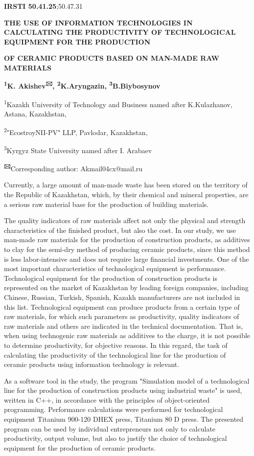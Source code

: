 \newpage
{\bfseries IRSTI 50.41.25};50.47.31

{\bfseries THE USE OF INFORMATION TECHNOLOGIES IN CALCULATING THE
PRODUCTIVITY OF TECHNOLOGICAL EQUIPMENT FOR THE PRODUCTION}

{\bfseries OF CERAMIC PRODUCTS BASED ON MAN-MADE RAW MATERIALS}

{\bfseries \textsuperscript{1}K. Akishev\textsuperscript{🖂},
\textsuperscript{2}K.Aryngazin, \textsuperscript{3}B.Biybosynov}

\textsuperscript{1}Kazakh University of Technology and Business named
after K.Kulazhanov, Astana, Kazakhstan,

\textsuperscript{2}"EcostroyNII-PV" LLP, Pavlodar, Kazakhstan\emph{,}

\textsuperscript{3}Kyrgyz State University named after I. Arabaev

{\bfseries \textsuperscript{🖂}}Corresponding author: Akmail04cx@mail.ru

Currently, a large amount of man-made waste has been stored on the
territory of the Republic of Kazakhstan, which, by their chemical and
mineral properties, are a serious raw material base for the production
of building materials.

The quality indicators of raw materials affect not only the physical and
strength characteristics of the finished product, but also the cost. In
our study, we use man-made raw materials for the production of
construction products, as additives to clay for the semi-dry method of
producing ceramic products, since this method is less labor-intensive
and does not require large financial investments. One of the most
important characteristics of technological equipment is performance.
Technological equipment for the production of construction products is
represented on the market of Kazakhstan by leading foreign companies,
including Chinese, Russian, Turkish, Spanish, Kazakh manufacturers are
not included in this list. Technological equipment can produce products
from a certain type of raw materials, for which such parameters as
productivity, quality indicators of raw materials and others are
indicated in the technical documentation. That is, when using
technogenic raw materials as additives to the charge, it is not possible
to determine productivity, for objective reasons. In this regard, the
task of calculating the productivity of the technological line for the
production of ceramic products using information technology is relevant.

As a software tool in the study, the program "Simulation model of a
technological line for the production of construction products using
industrial waste" is used, written in C++, in accordance with the
principles of object-oriented programming. Performance calculations were
performed for technological equipment Titanium 900-120 DHEX press,
Titanium 80 D press. The presented program can be used by individual
entrepreneurs not only to calculate productivity, output volume, but
also to justify the choice of technological equipment for the production
of ceramic products.

